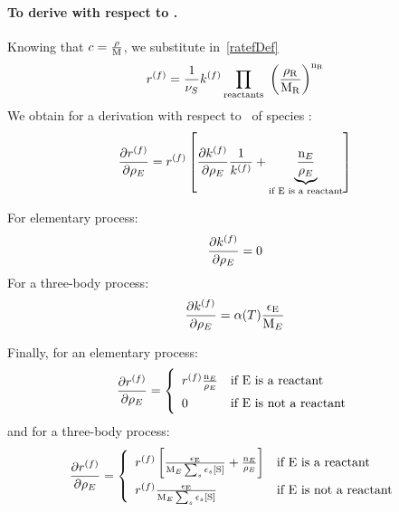 \paragraph{To derive with respect to \mass.}
Knowing that $\conc = \frac{\mass}{\Mm}$, we substitute in~\ref{ratefDef}
\begin{equation}
\fwdrate = \frac{1}{\scoef[S]} \fwdratecons \prod_\text{reactants}  \left(\frac{\mass[\reac]}{\Mm[\reac]}\right)^{\scoefabs[\reac]}
\end{equation}
We obtain for a derivation with respect to \mass[E]\ of species :
\begin{equation}
\doverdm[E]{\fwdrate} = \fwdrate \left[
                                \doverdm[E]{\fwdratecons} \frac{1}{\fwdratecons} +
                                \underbrace{\frac{\scoefabs[E]}{\mass[E]}}_{\text{if \ce{E} is a reactant}}
                              \right]
\end{equation}

For elementary process:
\begin{equation}
\doverdm[E]{\fwdratecons} = 0
\end{equation}
For a three-body process:
\begin{equation}
\doverdm[E]{\fwdratecons} = \kinMod \frac{\epsilon_{\ce{E}}}{\Mm[E]}
\end{equation}

Finally, for an elementary process:
\begin{equation}
\doverdm[E]{\fwdrate} = \left\{\begin{array}{ll}
                        \fwdrate \frac{\scoefabs[E]}{\mass[E]} & \text{if \ce{E} is a reactant} \\
                        0                                    & \text{if \ce{E} is not a reactant} \\
                      \end{array}\right.
\end{equation}
and for a three-body process:
\begin{equation}
\renewcommand{\arraystretch}{1.5}
\doverdm[E]{\fwdrate} = \left\{\begin{array}{ll}
                        \fwdrate \left[\frac{\epsilon_{\ce{E}}}{\Mm[E]\threeBody} + \frac{\scoefabs[E]}{\mass[E]} \right] 
                                                & \text{if \ce{E} is a reactant} \\
                        \fwdrate \frac{\epsilon_{\ce{E}}}{\Mm[E]\threeBody} 
                                                & \text{if \ce{E} is not a reactant} \\
                      \end{array}\right.
\end{equation}

